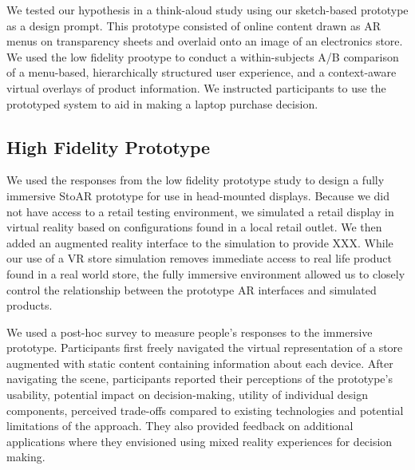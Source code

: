 We tested our hypothesis in a think-aloud study using our sketch-based prototype as a design prompt. This prototype consisted of online content drawn as AR menus on transparency sheets and overlaid onto an image of an electronics store. We used the low fidelity prootype to conduct a within-subjects A/B comparison of a menu-based, hierarchically structured user experience, and a context-aware virtual overlays of product information.   We instructed participants to use the prototyped system to aid in making a laptop purchase decision. 

\subsection{High Fidelity Prototype}
We used the responses from the low fidelity prototype study to design a fully immersive StoAR prototype for use in head-mounted displays. Because we did not have access to a retail testing environment, we simulated a retail display in virtual reality based on configurations found in a local retail outlet. We then added an augmented reality interface to the simulation to provide XXX. While our use of a VR store simulation removes immediate access to real life product found in a real world store, the fully immersive environment allowed us to closely control the relationship between the prototype AR interfaces and simulated products. %

We used a post-hoc survey to measure people's responses to the immersive prototype. Participants first freely navigated the virtual representation of a store augmented with static content containing information about each device. 
After navigating the scene, participants reported their perceptions of the prototype's usability, potential impact on decision-making, utility of individual design components, perceived trade-offs compared to existing technologies and potential limitations of the approach. They also provided feedback on additional applications where they envisioned using mixed reality experiences for decision making.  
